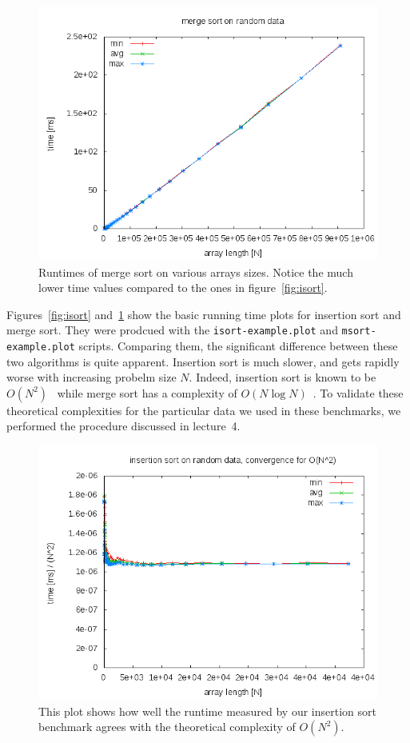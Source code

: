 \documentclass[a4paper,10pt]{article}
\begin{document}
\begin{figure}
  \centering
  \includegraphics[width=0.8\columnwidth]{../examples/msort-example.png}
  \caption{
    Runtimes of merge sort on various arrays sizes.
    Notice the much lower time values compared to the ones in figure~\ref{fig:isort}.
  }\label{fig:msort}
\end{figure}

Figures~\ref{fig:isort} and~\ref{fig:msort} show the basic running time plots for insertion sort and merge sort.
They were prodcued with the \texttt{isort-example.plot} and \texttt{msort-example.plot} scripts.
Comparing them, the significant difference between these two algorithms is quite apparent.
Insertion sort is much slower, and gets rapidly worse with increasing probelm size $N$.
Indeed, insertion sort is known to be $O(N^2)$~\cite{wikipedia:insertion-sort} while merge sort has a complexity of $O(N\log N)$~\cite{wikipedia:merge-sort}.
To validate these theoretical complexities for the particular data we used in these benchmarks, we performed the procedure discussed in lecture~4.

\begin{figure}
  \centering
  \includegraphics[width=0.8\columnwidth]{../examples/isort-example-N2.png}
  \caption{
    This plot shows how well the runtime measured by our insertion sort benchmark agrees with the theoretical complexity of $O(N^2)$.
  }\label{fig:isort-N2}
\end{figure}
\end{document}
